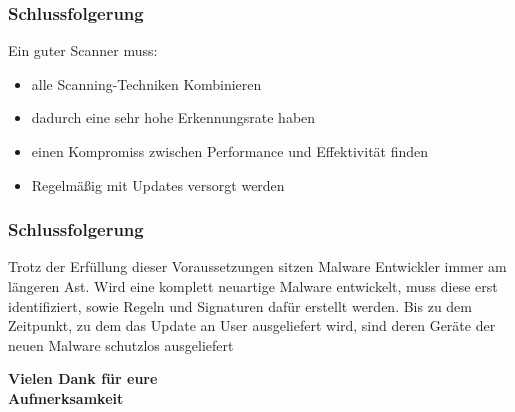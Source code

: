 \documentclass{beamer}
\begin{document}
\begin{frame}
	\frametitle{Schlussfolgerung}
	Ein guter Scanner muss:
	\begin{itemize}
		\item alle Scanning-Techniken Kombinieren
		\item dadurch eine sehr hohe Erkennungsrate haben
		\item einen Kompromiss zwischen Performance und Effektivität finden
		\item Regelmäßig mit Updates versorgt werden
	\end{itemize}
\end{frame}

\begin{frame}
	\frametitle{Schlussfolgerung}
	\begin{block}{}
		Trotz der Erfüllung dieser Voraussetzungen sitzen Malware Entwickler immer am längeren Ast. Wird eine komplett neuartige Malware entwickelt, muss diese erst identifiziert, sowie Regeln und Signaturen dafür erstellt werden. Bis zu dem Zeitpunkt, zu dem das Update an User ausgeliefert wird, sind deren Geräte der neuen Malware schutzlos ausgeliefert
	\end{block}
\end{frame}

\begin{frame}
	\begin{center}
	\LARGE{\textbf{ Vielen Dank für eure \\Aufmerksamkeit}}
	\end{center}
\end{frame}
\end{document}
